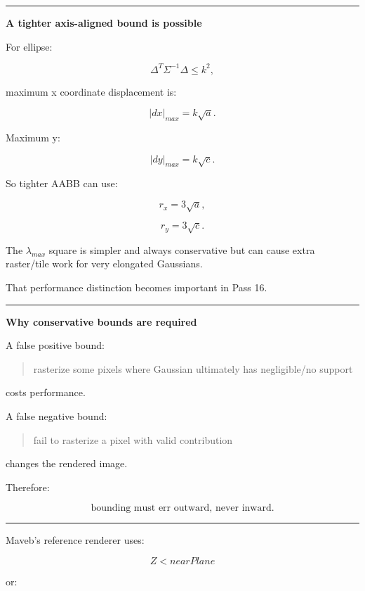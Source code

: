 \begin{center}\rule{0.5\linewidth}{0.5pt}\end{center}

\textbf{A tighter axis-aligned bound is possible}

For ellipse:

\[
\Delta^T
\Sigma^{-1}
\Delta
\le k^2,
\]

maximum x coordinate displacement is:

\[
\boxed{
|dx|_{max}
=
k\sqrt{a}.
}
\]

Maximum y:

\[
\boxed{
|dy|_{max}
=
k\sqrt{c}.
}
\]

So tighter AABB can use:

\[
r_x=3\sqrt a,
\]

\[
r_y=3\sqrt c.
\]

The \(\lambda_{max}\) square is simpler and always conservative but can cause extra raster/tile work for very elongated Gaussians.

That performance distinction becomes important in Pass 16.

\begin{center}\rule{0.5\linewidth}{0.5pt}\end{center}

\textbf{Why conservative bounds are required}

A false positive bound:

\begin{quote}
rasterize some pixels where Gaussian ultimately has negligible/no support
\end{quote}

costs performance.

A false negative bound:

\begin{quote}
fail to rasterize a pixel with valid contribution
\end{quote}

changes the rendered image.

Therefore:

\[
\boxed{
\text{bounding must err outward, never inward}.
}
\]

\begin{center}\rule{0.5\linewidth}{0.5pt}\end{center}

Maveb's reference renderer uses:

\[
Z<nearPlane
\]

or:

